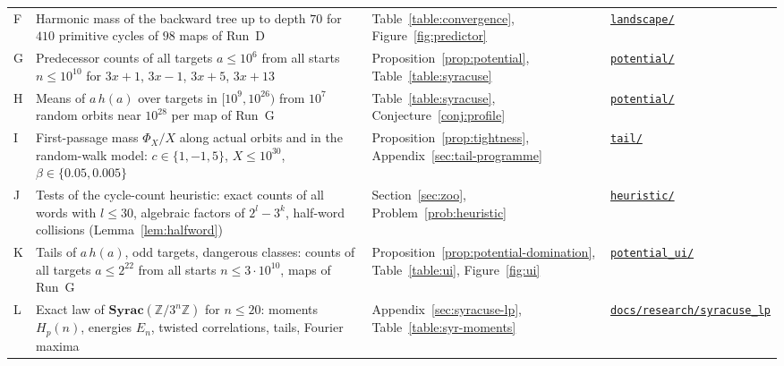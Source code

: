 \documentclass[12pt]{amsart}
\theoremstyle{definition}
\theoremstyle{remark}
\begin{document}
\begin{longtable}{@{}P{0.8cm}P{7.55cm}P{3.35cm}P{2.65cm}@{}}
F & Harmonic mass of the backward tree up to depth $70$ for $410$ primitive cycles of $98$ maps of Run~D & Table~\ref{table:convergence}, Figure~\ref{fig:predictor} & \href{https://github.com/Sultanow/collatz/tree/master/07\%20Basins\%20of\%20Attraction/results/landscape}{\texttt{landscape/}} \\
G & Predecessor counts of all targets $a\le10^6$ from all starts $n\le10^{10}$ for $3x+1$, $3x-1$, $3x+5$, $3x+13$ & Proposition~\ref{prop:potential}, Table~\ref{table:syracuse} & \href{https://github.com/Sultanow/collatz/tree/master/07\%20Basins\%20of\%20Attraction/results/potential}{\texttt{potential/}} \\
H & Means of $a\,h(a)$ over targets in $[10^9,10^{26})$ from $10^7$ random orbits near $10^{28}$ per map of Run~G & Table~\ref{table:syracuse}, Conjecture~\ref{conj:profile} & \href{https://github.com/Sultanow/collatz/tree/master/07\%20Basins\%20of\%20Attraction/results/potential}{\texttt{potential/}} \\
I & First-passage mass $\Phi_X/X$ along actual orbits and in the random-walk model: $c\in\{1,-1,5\}$, $X\le10^{30}$, $\beta\in\{0.05,0.005\}$ & Proposition~\ref{prop:tightness}, Appendix~\ref{sec:tail-programme} & \href{https://github.com/Sultanow/collatz/tree/master/07\%20Basins\%20of\%20Attraction/results/tail}{\texttt{tail/}} \\
J & Tests of the cycle-count heuristic: exact counts of all words with $l\le30$, algebraic factors of $2^l-3^k$, half-word collisions (Lemma~\ref{lem:halfword}) & Section~\ref{sec:zoo}, Problem~\ref{prob:heuristic} & \href{https://github.com/Sultanow/collatz/tree/master/07\%20Basins\%20of\%20Attraction/results/heuristic}{\texttt{heuristic/}} \\
K & Tails of $a\,h(a)$, odd targets, dangerous classes: counts of all targets $a\le2^{22}$ from all starts $n\le3\cdot10^{10}$, maps of Run~G & Proposition~\ref{prop:potential-domination}, Table~\ref{table:ui}, Figure~\ref{fig:ui} & \href{https://github.com/Sultanow/collatz/tree/master/07\%20Basins\%20of\%20Attraction/results/potential_ui}{\texttt{potential\_ui/}} \\
L & Exact law of $\mathbf{Syrac}(\mathbb Z/3^n\mathbb Z)$ for $n\le20$: moments $H_p(n)$, energies $E_n$, twisted correlations, tails, Fourier maxima & Appendix~\ref{sec:syracuse-lp}, Table~\ref{table:syr-moments} & \href{https://github.com/Sultanow/collatz/tree/master/07\%20Basins\%20of\%20Attraction/docs/research/syracuse_lp}{\texttt{docs/research/\allowbreak syracuse\_lp}} \\

\end{longtable}
\end{document}

